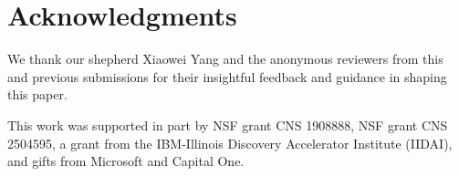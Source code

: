\section*{Acknowledgments}

We thank our shepherd Xiaowei Yang and the anonymous reviewers from this and previous submissions for their insightful feedback and guidance in shaping this paper.

This work was supported in part by NSF grant CNS 1908888, NSF grant CNS 2504595, a grant from the 
IBM-Illinois Discovery Accelerator Institute (IIDAI), 
and gifts from Microsoft and Capital One.